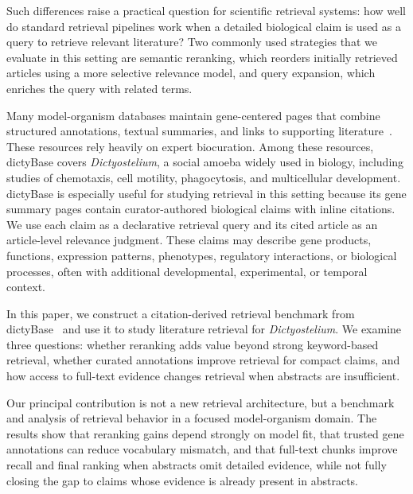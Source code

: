 \documentclass[runningheads]{llncs}
\begin{document}
Such differences raise a practical question for scientific retrieval systems: how well do standard retrieval pipelines work when a detailed biological claim is used as a query to retrieve relevant literature? Two commonly used strategies that we evaluate in this setting are semantic reranking, which reorders initially retrieved articles using a more selective relevance model, and query expansion, which enriches the query with related terms.

Many model-organism databases maintain gene-centered pages that combine
structured annotations, textual summaries, and links to supporting literature~\cite{ozturk-colak_flybase_2024,harris_wormbase_2020}. These
resources rely heavily on expert biocuration. Among these resources, dictyBase covers \emph{Dictyostelium}, a social amoeba
widely used in biology, including studies of chemotaxis,
cell motility, phagocytosis, and multicellular development.
dictyBase is especially useful for studying retrieval in this setting because its
gene summary pages contain curator-authored biological claims with inline
citations. We use each claim as a declarative retrieval query and its cited
article as an article-level relevance judgment. These claims may describe gene products, functions, expression
patterns, phenotypes, regulatory interactions, or biological processes, often
with additional developmental, experimental, or temporal context.

In this paper, we construct a citation-derived retrieval benchmark from
dictyBase~\cite{fey_one_2013} and use it to study literature retrieval for
\emph{Dictyostelium}. We examine three questions: whether reranking adds value beyond strong keyword-based retrieval, whether curated annotations
improve retrieval for compact claims, and how access to full-text evidence changes retrieval
when abstracts are insufficient.

Our principal contribution is not a new retrieval architecture, but a benchmark
and analysis of retrieval behavior in a focused model-organism domain. The
results show that reranking gains depend strongly on model fit, that trusted
gene annotations can reduce vocabulary mismatch, and that full-text chunks improve
recall and final ranking when abstracts omit detailed evidence, while not fully
closing the gap to claims whose evidence is already present in abstracts.
\end{document}
